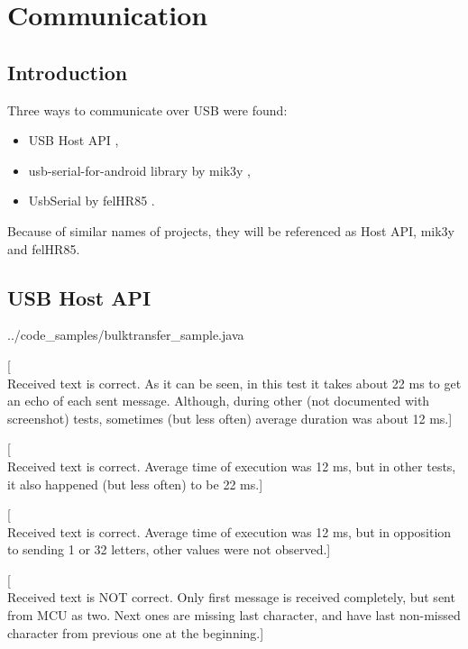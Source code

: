 \chapter{Communication}

\section{Introduction}
Three ways to communicate over USB were found:
\begin{itemize}
  \item USB Host API \cite{android_reference},
  \item usb-serial-for-android library by mik3y \cite{mik3y},
  \item UsbSerial by felHR85 \cite{felHR85}.
\end{itemize}
Because of similar names of projects, they will be referenced as Host API,
mik3y and felHR85.


\section{USB Host API}


{../code_samples/bulktransfer_sample.java}

[\\Received text is correct. As it can be seen, in this test it takes about 22
ms to get an echo of each sent message. Although, during other (not documented
with screenshot) tests, sometimes (but less often) average duration was about 12
ms.]

[\\Received text is correct. Average time of execution was 12 ms, but in other
tests, it also happened (but less often) to be 22 ms.]

[\\Received text is correct. Average time of execution was 12 ms, but in
opposition to sending 1 or 32 letters, other values were not observed.]

[\\Received text is NOT correct. Only first message is received completely, but
sent from MCU as two. Next ones are missing last character, and have last
non-missed character from previous one at the beginning.]

